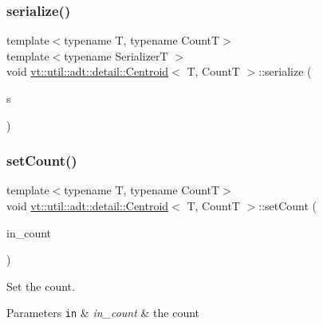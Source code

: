 \subsubsection{\texorpdfstring{serialize()}{serialize()}}
{\footnotesize\ttfamily template$<$typename T, typename CountT$>$ \\
template$<$typename SerializerT $>$ \\
void \hyperlink{structvt_1_1util_1_1adt_1_1detail_1_1_centroid}{vt\+::util\+::adt\+::detail\+::\+Centroid}$<$ T, CountT $>$\+::serialize (\begin{DoxyParamCaption}\item[{SerializerT \&}]{s }\end{DoxyParamCaption})\hspace{0.3cm}{\ttfamily [inline]}}

\mbox{\label{structvt_1_1util_1_1adt_1_1detail_1_1_centroid_a7abe96415d943f38db8381a7be593fde}} 
\subsubsection{\texorpdfstring{set\+Count()}{setCount()}}
{\footnotesize\ttfamily template$<$typename T, typename CountT$>$ \\
void \hyperlink{structvt_1_1util_1_1adt_1_1detail_1_1_centroid}{vt\+::util\+::adt\+::detail\+::\+Centroid}$<$ T, CountT $>$\+::set\+Count (\begin{DoxyParamCaption}\item[{\hyperlink{structvt_1_1util_1_1adt_1_1detail_1_1_centroid_ac3815361e4f13eeb8b2863d2eb8db1dd}{Count\+Type}}]{in\+\_\+count }\end{DoxyParamCaption})\hspace{0.3cm}{\ttfamily [inline]}}



Set the count. 


\begin{DoxyParams}[1]{Parameters}
\mbox{\tt in}  & {\em in\+\_\+count} & the count \\
\hline
\end{DoxyParams}
\mbox{\label{structvt_1_1util_1_1adt_1_1detail_1_1_centroid_a3d847e231f7e152242a78be89b41e55b}} 
